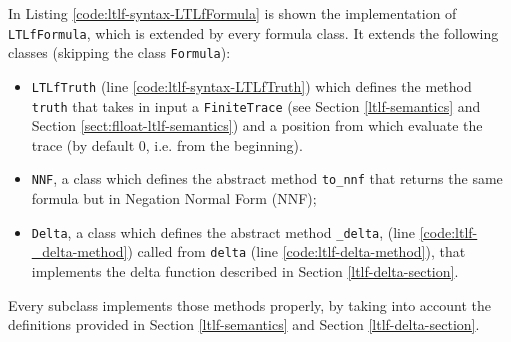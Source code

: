 In Listing \ref{code:ltlf-syntax-LTLfFormula} is shown the implementation of \texttt{LTLfFormula}, which is extended by every \LTLf formula class. It extends the following classes (skipping the class \texttt{Formula}):
\begin{itemize}
\item \texttt{LTLfTruth} (line \ref{code:ltlf-syntax-LTLfTruth}) which defines the method \texttt{truth} that takes in input a \texttt{FiniteTrace} (see Section \ref{ltlf-semantics} and Section \ref{sect:flloat-ltlf-semantics}) and a position from which evaluate the trace (by default 0, i.e. from the beginning).
\item \texttt{NNF}, a class which defines the abstract method \texttt{to\_nnf} that returns the same formula but in Negation Normal Form (NNF);
\item \texttt{Delta}, a class which defines the abstract method \texttt{\_delta}, (line \ref{code:ltlf-_delta-method}) called from \texttt{delta} (line \ref{code:ltlf-delta-method}), that implements the delta function described in Section \ref{ltlf-delta-section}.
\end{itemize}

Every subclass implements those methods properly, by taking into account the definitions provided in Section \ref{ltlf-semantics} and Section \ref{ltlf-delta-section}.

